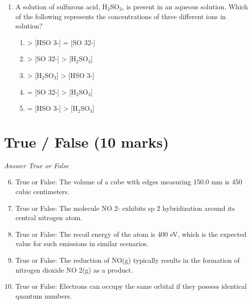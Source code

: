 \documentclass[12pt]{article}
\begin{document}
\begin{enumerate}[label=\arabic*.]
\begin{enumerate}[label=(\alph*)]
    \item Bond order of He\_2 is 0 and He\_2^+ is 0.5
    \item Bond order of He\_2 is 0.5 and He\_2^+ is 0
    \item Bond order of He\_2 and He\_2^+ is 0.5
    \item Bond order of He\_2 is 2 and He\_2^+ is 1.5
    \item Bond order of He\_2 is 1 and He\_2^+ is 0
\end{enumerate}
\item A solution of sulfurous acid, H$_{2}$SO$_{3}$, is present in an aqueous solution. Which of the following represents the concentrations of three different ions in solution?
\begin{enumerate}[label=(\alph*)]
    \item [H$_{2}$SO$_{3}$] \textgreater{} [HSO 3-] = [SO 32-]
    \item [HSO 3-] \textgreater{} [SO 32-] \textgreater{} [H$_{2}$SO$_{3}$]
    \item [SO 32-] \textgreater{} [H$_{2}$SO$_{3}$] \textgreater{} [HSO 3-]
    \item [HSO 3-] = [SO 32-] \textgreater{} [H$_{2}$SO$_{3}$]
    \item [SO 32-] = [HSO 3-] \textgreater{} [H$_{2}$SO$_{3}$]
\end{enumerate}
\end{enumerate}

\section*{True / False (10 marks)}
\textit{Answer True or False}
\begin{enumerate}[label=\arabic*.]
\setcounter{enumi}{5}
\item True or False: The volume of a cube with edges measuring 150.0 mm is 450 cubic centimeters.
\item True or False: The molecule NO 2- exhibits sp 2 hybridization around its central nitrogen atom.
\item True or False: The recoil energy of the atom is 400 eV, which is the expected value for such emissions in similar scenarios.
\item True or False: The reduction of NO(g) typically results in the formation of nitrogen dioxide NO 2(g) as a product.
\item True or False: Electrons can occupy the same orbital if they possess identical quantum numbers.
\end{enumerate}
\end{document}
